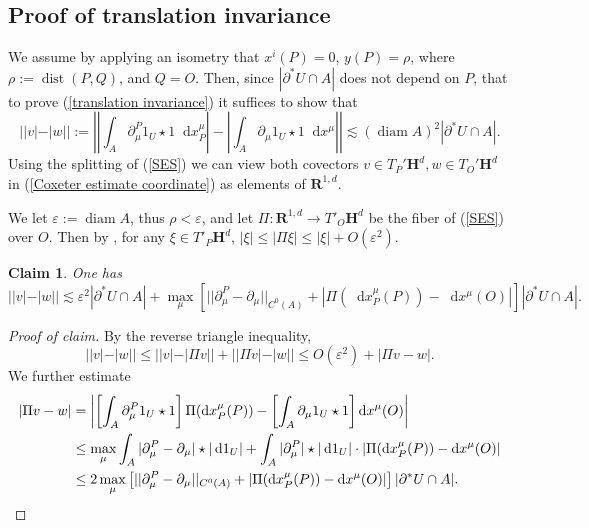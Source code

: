 \documentclass[reqno,10pt]{amsart}
\newcommand{\RR}{\mathbf{R}}
\newcommand{\Hyp}{\mathbf H}
\DeclareMathOperator{\diam}{diam}
\newcommand*\dif{\mathop{}\!\mathrm{d}}
\DeclareMathOperator{\dist}{dist}
\newtheorem{claim}{Claim}[theorem]
\theoremstyle{definition}
\numberwithin{equation}{section}
\begin{document}
\subsection{Proof of translation invariance}
We assume by applying an isometry that $x^i(P) = 0$, $y(P) = \rho$, where $\rho := \dist(P, Q)$, and $Q = O$.
Then, since $|\partial^* U \cap A|$ does not depend on $P$, that to prove (\ref{translation invariance}) it suffices to show that
\begin{equation} \label{Coxeter estimate coordinate}
||v| - |w|| := \left|\left|\int_A \partial_\mu^P 1_U \star 1 \dif x^\mu_P\right| - \left|\int_A \partial_\mu 1_U \star 1 \dif x^\mu\right|\right| \lesssim (\diam A)^2 |\partial^* U \cap A|.
\end{equation}  
Using the splitting of (\ref{SES}) we can view both covectors $v \in T_P' \Hyp^d, w \in T_O' \Hyp^d$ in (\ref{Coxeter estimate coordinate}) as elements of $\RR^{1, d}$.

We let $\varepsilon := \diam A$, thus $\rho < \varepsilon$, and let $\Pi: \RR^{1, d} \to T'_O\Hyp^d$ be the fiber of (\ref{SES}) over $O$.
Then by \cite[Lemma 4.2]{daskalopoulosPrep1}, for any $\xi \in T'_P \Hyp^d$, $|\xi| \leq |\Pi \xi| \leq |\xi| + O(\varepsilon^2)$.

\begin{claim}
One has
$$||v| - |w|| \lesssim \varepsilon^2 |\partial^* U \cap A| + \max_\mu \left[||\partial^P_\mu - \partial_\mu||_{C^0(A)} + |\Pi(\dif x_P^\mu(P)) - \dif x^\mu(O)|\right] |\partial^* U \cap A|.$$
\end{claim}
\begin{proof}[Proof of claim]
By the reverse triangle inequality,
$$||v| - |w|| \leq ||v| - |\Pi v|| + ||\Pi v| - |w|| \leq O(\varepsilon^2) + |\Pi v - w|.$$
We further estimate
\begin{align*}
|\Pi v - w| &= \left|\left[\int_A \partial^P_\mu 1_U \star 1\right] \Pi(\dif x_P^\mu(P)) - \left[\int_A \partial_\mu 1_U \star 1\right] \dif x^\mu(O)\right| \\
&\leq \max_\mu \int_A |\partial^P_\mu - \partial_\mu| \star |\dif 1_U| + \int_A |\partial_\mu^P| \star |\dif 1_U| \cdot |\Pi(\dif x_P^\mu(P)) - \dif x^\mu(O)| \\
&\leq 2 \max_\mu \left[||\partial^P_\mu - \partial_\mu||_{C^0(A)} + |\Pi(\dif x_P^\mu(P)) - \dif x^\mu(O)|\right] |\partial^* U \cap A|. \qedhere
\end{align*}
\end{proof}
\end{document}
